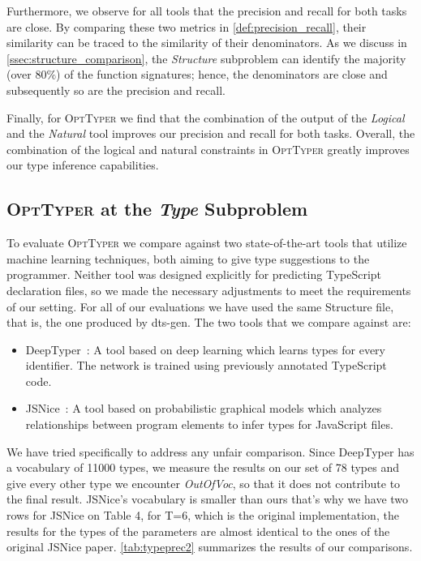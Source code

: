 \documentclass[sigplan,10pt,review,anonymous]{acmart} %
\newcommand{\projectname}{\textsc{OptTyper}\xspace}
\theoremstyle{plain}
\theoremstyle{remark}
\theoremstyle{definition}
\begin{document}
Furthermore, we observe for all tools that the precision and recall for both tasks are close.
By comparing these two metrics in \cref{def:precision_recall},
their similarity can be traced to the similarity of their denominators.
As we discuss in \cref{ssec:structure_comparison},
the \textit{Structure} subproblem can identify the majority (over $80\%$) of the function signatures;
hence, the denominators are close and subsequently so are the precision and recall.

Finally, for \projectname we find that the combination of the output of the \textit{Logical}
and the \textit{Natural} tool improves our precision and recall for both tasks.
Overall, the combination of the logical and natural constraints in \projectname
greatly improves our type inference capabilities.

\subsection{\projectname at the \textit{Type} Subproblem}
\label{ssec:typesubproblem}

To evaluate \projectname we compare against two state-of-the-art tools that utilize machine learning techniques,
both aiming to give type suggestions to the programmer.
Neither tool was designed explicitly for predicting TypeScript declaration files,
so we made the necessary adjustments to meet the requirements of our setting.
For all of our evaluations we have used the same Structure file, that is, the one produced by dts-gen.
The two tools that we compare against are:
\begin{itemize}[label={\tiny$\bullet$}]
	\item DeepTyper~\cite{hellendoorn18}: A tool based on deep learning which learns types for every identifier.
	      The network is trained using previously annotated TypeScript code.
	\item JSNice~\cite{raychev15}: A tool based on probabilistic graphical models which analyzes relationships
	      between program elements to infer types for JavaScript files.
\end{itemize}

We have tried specifically to address any unfair comparison.
Since DeepTyper has a vocabulary of 11000 types, we measure the results on our set of 78 types
and give every other type we encounter \textit{OutOfVoc}, so that it does not contribute to the final result.
JSNice's vocabulary is smaller than ours that's why we have two rows for JSNice on Table 4, for T=6,
which is the original implementation,
the results for the types of the parameters are almost identical to the ones of the original JSNice paper.
\cref{tab:typeprec2} summarizes the results of our comparisons.
\end{document}
